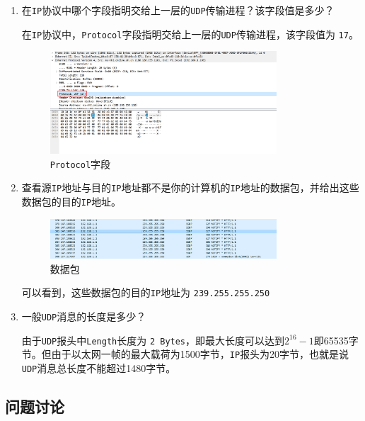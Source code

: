 \documentclass{article}
\begin{document}
\begin{enumerate}[label={\arabic*})]
  \item 在\texttt{IP}协议中哪个字段指明交给上一层的\texttt{UDP}传输进程？该字段值是多少？

        在\texttt{IP}协议中，\texttt{Protocol}字段指明交给上一层的\texttt{UDP}传输进程，该字段值为 \texttt{17}。

        \begin{figure}[H]
          \centering
          \includegraphics[width=0.8\textwidth]{img/7.png}
          \caption{\texttt{Protocol}字段}
        \end{figure}

  \item 查看源\texttt{IP}地址与目的\texttt{IP}地址都不是你的计算机的\texttt{IP}地址的数据包，并给出这些数据包的目的\texttt{IP}地址。

        \begin{figure}[H]
          \centering
          \includegraphics[width=0.8\textwidth]{img/8.png}
          \caption{数据包}
        \end{figure}

        可以看到，这些数据包的目的\texttt{IP}地址为 \texttt{239.255.255.250}

  \item 一般\texttt{UDP}消息的长度是多少？

        由于\texttt{UDP}报头中\texttt{Length}长度为 \texttt{2 Bytes}，即最大长度可以达到$2^{16}-1$即65535字节。但由于以太网一帧的最大载荷为1500字节，\texttt{IP}报头为20字节，也就是说\texttt{UDP}消息总长度不能超过1480字节。

\end{enumerate}

\subsection{问题讨论}
\end{document}
